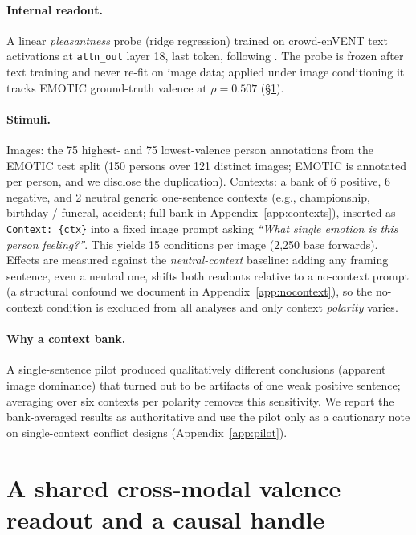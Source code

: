 \documentclass{article}
\begin{document}
\paragraph{Internal readout.}
A linear \emph{pleasantness} probe (ridge regression) trained on crowd-enVENT \citep{troiano2023} text activations at \texttt{attn\_out} layer 18, last token, following \citet{tak2025}. The probe is frozen after text training and never re-fit on image data; applied under image conditioning it tracks EMOTIC ground-truth valence at $\rho = 0.507$ (\S\ref{sec:foundations}).

\paragraph{Stimuli.}
Images: the 75 highest- and 75 lowest-valence person annotations from the EMOTIC test split (150 persons over 121 distinct images; EMOTIC is annotated per person, and we disclose the duplication). Contexts: a bank of 6 positive, 6 negative, and 2 neutral generic one-sentence contexts (e.g., championship, birthday / funeral, accident; full bank in Appendix~\ref{app:contexts}), inserted as \texttt{Context: \{ctx\}} into a fixed image prompt asking \emph{``What single emotion is this person feeling?''}. This yields 15 conditions per image (2{,}250 base forwards). Effects are measured against the \emph{neutral-context} baseline: adding any framing sentence, even a neutral one, shifts both readouts relative to a no-context prompt (a structural confound we document in Appendix~\ref{app:nocontext}), so the no-context condition is excluded from all analyses and only context \emph{polarity} varies.

\paragraph{Why a context bank.}
A single-sentence pilot produced qualitatively different conclusions (apparent image dominance) that turned out to be artifacts of one weak positive sentence; averaging over six contexts per polarity removes this sensitivity. We report the bank-averaged results as authoritative and use the pilot only as a cautionary note on single-context conflict designs (Appendix~\ref{app:pilot}).

\section{A shared cross-modal valence readout and a causal handle}
\label{sec:foundations}
\end{document}
